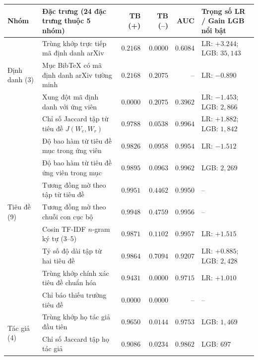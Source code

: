 \begin{table}[htbp]
    \centering
    \scriptsize
    \renewcommand{\arraystretch}{1.14}
    \begin{tabularx}{\textwidth}{l X r r r l}
        \toprule
        \textbf{Nhóm} & \textbf{Đặc trưng (24 đặc trưng thuộc 5 nhóm)} & \textbf{TB (+)} & \textbf{TB (--)} & \textbf{AUC} & \textbf{Trọng số LR / Gain LGB nổi bật} \\
        \midrule
        \multirow{3}{*}{Định danh (3)}
            & Trùng khớp trực tiếp mã định danh arXiv & $0.2168$ & $0.0000$ & $0.6084$ & LR: $+3.244$; LGB: $35{,}143$ \\
            & Mục BibTeX có mã định danh arXiv tường minh & $0.2168$ & $0.2075$ & -- & LR: $-0.890$ \\
            & Xung đột mã định danh với ứng viên & $0.0000$ & $0.2075$ & $0.3962$ & LR: $-1.453$; LGB: $2{,}866$ \\
        \midrule
        \multirow{9}{*}{Tiêu đề (9)}
            & Chỉ số Jaccard tập từ tiêu đề $J(W_e, W_r)$ & $0.9788$ & $0.0538$ & $\mathbf{0.9964}$ & LR: $+1.882$; LGB: $1{,}842$ \\
            & Độ bao hàm từ tiêu đề mục trong ứng viên & $0.9826$ & $0.0958$ & $0.9954$ & LR: $-1.512$ \\
            & Độ bao hàm từ tiêu đề ứng viên trong mục & $0.9895$ & $0.0963$ & $0.9962$ & LGB: $2{,}269$ \\
            & Tương đồng mờ theo tập từ tiêu đề & $0.9951$ & $0.4462$ & $0.9950$ & -- \\
            & Tương đồng mờ theo chuỗi con cục bộ & $0.9948$ & $0.4759$ & $0.9956$ & -- \\
            & Cosin TF-IDF $n$-gram ký tự ($3$--$5$) & $0.9871$ & $0.1102$ & $0.9957$ & LR: $+1.515$ \\
            & Tỷ số độ dài tập từ hai tiêu đề & $0.9864$ & $0.7094$ & $0.9207$ & LR: $+0.885$; LGB: $2{,}428$ \\
            & Trùng khớp chính xác tiêu đề chuẩn hóa & $0.9431$ & $0.0000$ & $0.9715$ & LR: $+1.010$ \\
            & Chỉ báo thiếu trường tiêu đề & $0.0000$ & $0.0000$ & -- & -- \\
        \midrule
        \multirow{4}{*}{Tác giả (4)}
            & Trùng khớp họ tác giả đầu tiên & $0.9650$ & $0.0144$ & $0.9753$ & LGB: $1{,}469$ \\
            & Chỉ số Jaccard tập họ tác giả & $0.9086$ & $0.0234$ & $\mathbf{0.9862}$ & LGB: $697$ \\

\end{tabularx}
\end{table}
